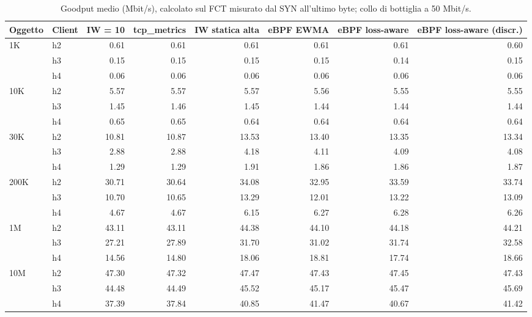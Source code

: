 \begin{table}[htbp]
  \centering
  \caption{Goodput medio (Mbit/s), calcolato sul FCT misurato dal SYN all'ultimo byte; collo di bottiglia a 50 Mbit/s.}
  \label{tab:goodput-50}
  \begin{tabular}{llrrrrrr}
    \toprule
    Oggetto & Client & IW = 10 & tcp\_metrics & IW statica alta & eBPF EWMA & eBPF loss-aware & eBPF loss-aware (discr.) \\
    \midrule
    1K & h2 & 0.61 & 0.61 & 0.61 & 0.61 & 0.61 & 0.60 \\
     & h3 & 0.15 & 0.15 & 0.15 & 0.15 & 0.14 & 0.15 \\
     & h4 & 0.06 & 0.06 & 0.06 & 0.06 & 0.06 & 0.06 \\
    \addlinespace
    10K & h2 & 5.57 & 5.57 & 5.57 & 5.56 & 5.55 & 5.55 \\
     & h3 & 1.45 & 1.46 & 1.45 & 1.44 & 1.44 & 1.44 \\
     & h4 & 0.65 & 0.65 & 0.64 & 0.64 & 0.64 & 0.64 \\
    \addlinespace
    30K & h2 & 10.81 & 10.87 & 13.53 & 13.40 & 13.35 & 13.34 \\
     & h3 & 2.88 & 2.88 & 4.18 & 4.11 & 4.09 & 4.08 \\
     & h4 & 1.29 & 1.29 & 1.91 & 1.86 & 1.86 & 1.87 \\
    \addlinespace
    200K & h2 & 30.71 & 30.64 & 34.08 & 32.95 & 33.59 & 33.74 \\
     & h3 & 10.70 & 10.65 & 13.29 & 12.01 & 13.22 & 13.09 \\
     & h4 & 4.67 & 4.67 & 6.15 & 6.27 & 6.28 & 6.26 \\
    \addlinespace
    1M & h2 & 43.11 & 43.11 & 44.38 & 44.10 & 44.18 & 44.21 \\
     & h3 & 27.21 & 27.89 & 31.70 & 31.02 & 31.74 & 32.58 \\
     & h4 & 14.56 & 14.80 & 18.06 & 18.81 & 17.74 & 18.66 \\
    \addlinespace
    10M & h2 & 47.30 & 47.32 & 47.47 & 47.43 & 47.45 & 47.43 \\
     & h3 & 44.48 & 44.49 & 45.52 & 45.17 & 45.47 & 45.69 \\
     & h4 & 37.39 & 37.84 & 40.85 & 41.47 & 40.67 & 41.42 \\
    \bottomrule
  \end{tabular}
\end{table}
